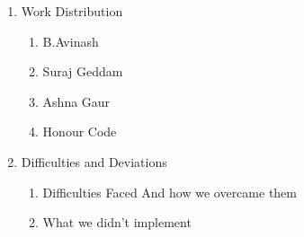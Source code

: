 \documentclass{article}
\begin{document}
\begin{enumerate}
\begin{enumerate} [label*=\arabic*.]
        \large \item Doxygen
        \large \item HTML, CSS
        \large \item Latex
    \end{enumerate}
    \LARGE  \item Work Distribution
    \begin{enumerate} [label*=\arabic*.]
        \large \item B.Avinash
        \large \item Suraj Geddam
        \large \item Ashna Gaur
        \large \item Honour Code
    \end{enumerate}
    \LARGE  \item Difficulties and Deviations
    \begin{enumerate} [label*=\arabic*.]
        \large \item Difficulties Faced And how we overcame them
        \large \item What we didn't implement
    \end{enumerate}
\end{enumerate}
\clearpage
 
\end{document}
